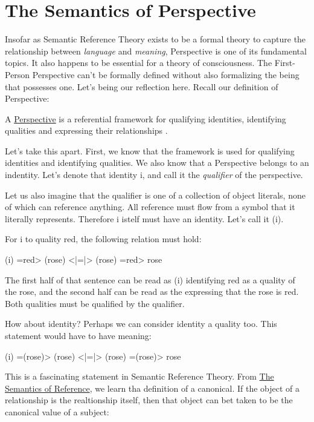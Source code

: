 \documentclass[runningheads]{llncs}
\begin{document}

\section{The Semantics of Perspective}

Insofar as Semantic Reference Theory exists to be a formal theory to capture the relationship between \emph{language} and \emph{meaning}, Perspective is one of its fundamental topics. It also happens to be essential for a theory of consciousness. The First-Person Perspective can't be formally defined without also formalizing the being that possesses one. Let's being our reflection here. Recall our definition of Perspective:

\setcounter{definition}{1}
\begin{sdefinition}
	A \href{https://github.com/DNA-Platform/inexplicable-phenomena/formalism/definitions/perspective.pdf}{Perspective} is a referential framework for qualifying identities, identifying qualities and expressing their relationships \cite{Formalism}.
\end{sdefinition}

Let's take this apart. First, we know that the framework is used for qualifying identities and identifying qualities. We also know that a Perspective belongs to an indentity. Let's denote that identity i, and call it the \emph{qualifier} of the perspective. 

Let us also imagine that the qualifier is one of a collection of object literals, none of which can reference anything. All reference must flow from a symbol that it literally represents. Therefore i istelf must have an identity. Let's call it (i).

For i to quality red, the following relation must hold:

(i) =red> (rose) <|=|> (rose) =red> rose

The first half of that sentence can be read as (i) identifying red as a quality of the rose, and the second half can be read as the expressing that the rose is red. Both qualities must be qualified by the qualifier. 

How about identity? Perhaps we can consider identity a quality too. This statement would have to have meaning:

(i) =(rose)> (rose) <|=|> (rose) =(rose)> rose

This is a fascinating statement in Semantic Reference Theory. From \href{https://github.com/DNA-Platform/inexplicable-phenomena/formalism/semantic-reference-theory/reference.pdf}{The Semantics of Reference}, we learn tha definition of a canonical. If the object of a relationship is the realtionship itself, then that object can bet taken to be the canonical value of a subject:
\end{document}
